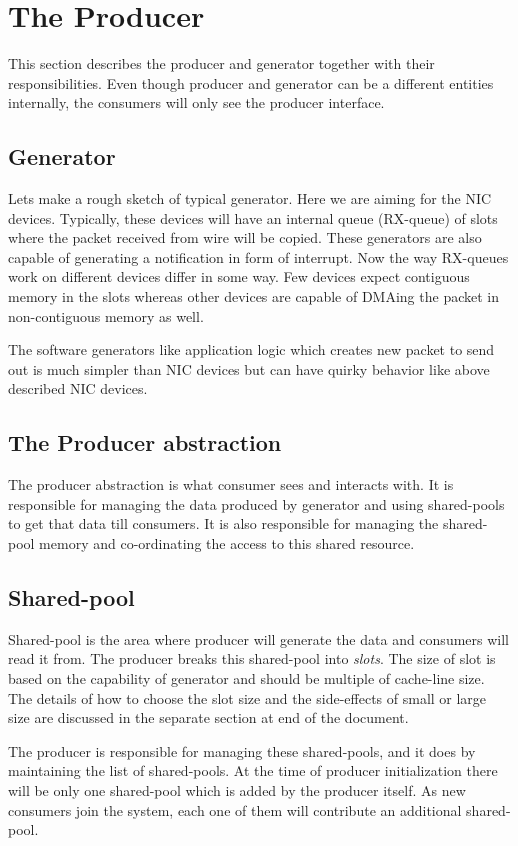 \documentclass[a4paper,twoside]{report} %
\begin{document}
\section{The Producer}
This section describes the producer and generator together with
their responsibilities.  Even though producer and generator can
be a different entities internally, the consumers will only see
the producer interface.

\subsection{Generator}
Lets make a rough sketch of typical generator.  Here we are aiming
for the NIC devices.  Typically, these devices will have an
internal queue (RX-queue) of slots where the packet received
from wire will be copied.  These generators are also capable
of generating a notification in form of interrupt.  Now the
way RX-queues work on different devices differ in some way.
Few devices expect contiguous memory in the slots whereas
other devices are capable of DMAing the packet in non-contiguous
memory as well.

	
The software generators like application
logic which creates new packet to send out is much simpler than
NIC devices but can have quirky behavior like above described
NIC devices.


\subsection{The Producer abstraction}
The producer abstraction is what consumer sees and interacts with.
It is responsible for managing the data produced by generator and
using shared-pools to get that data till consumers.  It is also
responsible for managing the shared-pool memory and co-ordinating 
the access to this shared resource.


\subsection{Shared-pool}
Shared-pool is the area where producer will generate the data
and consumers will read it from. The producer breaks this
shared-pool into \textit{slots}.  The size of slot
is based on the capability of generator and should be multiple of
cache-line size.  The details of how to choose
the slot size and the side-effects of small or large size are
discussed in the separate section at end of the document.


The producer is responsible for managing these shared-pools, and it
does by maintaining the list of shared-pools.  At the time of producer
initialization there will be only one shared-pool which is added by
the producer itself.  As new consumers join the system, each one of 
them will contribute an additional shared-pool.
\end{document}
